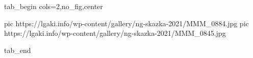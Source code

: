  
 
 
 
 

\ifcmt
  tab_begin cols=2,no_fig,center

     pic https://lgaki.info/wp-content/gallery/ng-skazka-2021/MMM_0884.jpg
		 pic https://lgaki.info/wp-content/gallery/ng-skazka-2021/MMM_0845.jpg

  tab_end
\fi
